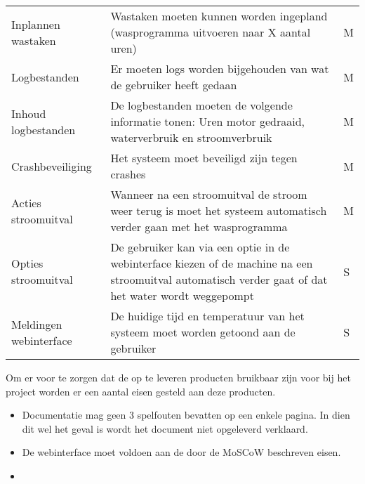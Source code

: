 \begin{longtable}{ p{3cm} p{7cm} l }
Inplannen wastaken & Wastaken moeten kunnen worden ingepland (wasprogramma uitvoeren naar X aantal uren) & M \\
Logbestanden & Er moeten logs worden bijgehouden van wat de gebruiker heeft gedaan & M \\
Inhoud logbestanden & De logbestanden moeten de volgende informatie tonen: Uren motor gedraaid, waterverbruik en stroomverbruik & M \\
Crashbeveiliging & Het systeem moet beveiligd zijn tegen crashes & M \\
Acties stroomuitval & Wanneer na een stroomuitval de stroom weer terug is moet het systeem automatisch verder gaan met het wasprogramma & M \\
Opties stroomuitval & De gebruiker kan via een optie in de webinterface kiezen of de machine na een stroomuitval automatisch verder gaat of dat het water wordt weggepompt & S \\
Meldingen webinterface & De huidige tijd en temperatuur van het systeem moet worden getoond aan de gebruiker & S \\
\end{longtable}



\subtitle{Kwaliteitseisen op te leveren producten}
Om er voor te zorgen dat de op te leveren producten bruikbaar zijn voor bij het project worden er een aantal eisen gesteld aan deze producten.

\begin{itemize}
	\item Documentatie mag geen 3 spelfouten bevatten op een enkele pagina. In dien dit wel het geval is wordt het document niet opgeleverd verklaard.
	\item De webinterface moet voldoen aan de door de MoSCoW beschreven eisen.
	\item 
\end{itemize}

